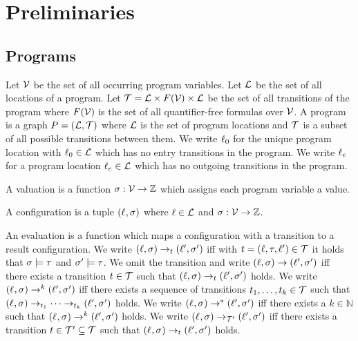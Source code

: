 \section{Preliminaries}


\subsection{Programs}

\begin{definition}[Program] 
	Let $\mathcal{V}$ be the set of all occurring program variables.
	Let $\mathcal{L}$ be the set of all locations of a program.
	Let $\mathcal{T} = \mathcal{L} \times F(\mathcal{V}) \times \mathcal{L}$ be the set of all transitions of the program where $F(\mathcal{V})$ is the set of all quantifier-free formulas over $\mathcal{V}$.
	A program is a graph $P = (\mathcal{L}, \mathcal{T})$ where $\mathcal{L}$ is the set of program locations and $\mathcal{T}$ is a subset of all possible transitions between them.
	We write $\ell_0$ for the unique program location with $\ell_0 \in \mathcal{L}$ which has no entry transitions in the program.
	We write $\ell_e$ for a program location $\ell_e \in \mathcal{L}$ which has no outgoing transitions in the program.
\end{definition}

\begin{definition}[Valuation] 
	A valuation is a function $\sigma: \mathcal{V} \rightarrow \mathbb{Z}$ which assigns each program variable a value.
\end{definition}

\begin{definition}[Configuration] 
	A configuration is a tuple $(\ell_{}, \sigma_{})$ where $\ell \in \mathcal{L}$ and $\sigma: \mathcal{V} \rightarrow \mathbb{Z}$.
\end{definition}

\begin{definition}[Evaluation] 
	An evaluation is a function which maps a configuration with a transition to a result configuration.
	We write $(\ell, \sigma) \rightarrow_t (\ell', \sigma')$ iff with $t = (\ell, \tau, \ell') \in \mathcal{T}$ it holds that $\sigma \models \tau$ and $\sigma' \models \tau$.
	We omit the transition and write $(\ell, \sigma) \rightarrow (\ell', \sigma')$ iff there exists a transition $t \in \mathcal{T}$ such that $(\ell, \sigma) \rightarrow_t (\ell', \sigma')$ holds.
	We write $(\ell_{}, \sigma_{}) \rightarrow^k (\ell', \sigma')$ iff there exists a sequence of transitions $t_1, \dots, t_k \in \mathcal{T}$ such that $(\ell_{}, \sigma_{}) \rightarrow_{t_1} \dots \rightarrow_{t_k} (\ell', \sigma')$ holds.
	We write $(\ell_{}, \sigma_{}) \rightarrow^* (\ell', \sigma')$ iff there exists a $k \in \mathbb{N}$ such that $(\ell_{}, \sigma_{}) \rightarrow^k (\ell', \sigma')$ holds.
	We write $(\ell_{}, \sigma_{}) \rightarrow_{\mathcal{T}'} (\ell', \sigma')$ iff there exists a transition $t \in \mathcal{T}' \subseteq \mathcal{T}$ such that $(\ell_{}, \sigma_{}) \rightarrow_t (\ell', \sigma')$ holds.
\end{definition}


